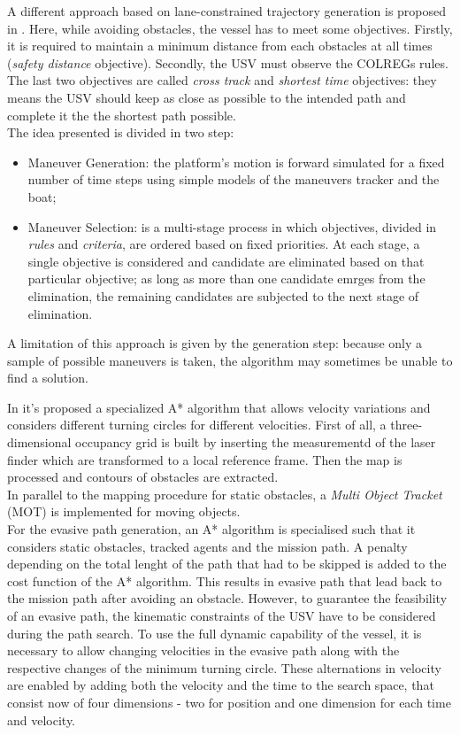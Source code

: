 \documentclass[journal]{IEEEtran}
\begin{document}
              A different approach based on lane-constrained trajectory generation is proposed in \parencite{Tan2010}. Here, while avoiding obstacles, the vessel has to meet some objectives. Firstly, it is required to maintain a minimum distance from each obstacles at all times (\textit{safety distance} objective). Secondly, the USV must observe the COLREGs rules. The last two objectives are called \textit{cross track} and \textit{shortest time} objectives: they means the USV should keep as close as possible to the intended path and complete it the the shortest path possible.\\
              The idea presented is divided in two step:
                    \begin{itemize}
                          \item Maneuver Generation: the platform's motion is forward simulated for a fixed number of time steps using simple models of the maneuvers tracker and the boat;
                          \item Maneuver Selection: is a multi-stage process in which objectives, divided in \textit{rules} and \textit{criteria}, are ordered based on fixed priorities. At each stage, a single objective is considered and candidate are eliminated based on that particular objective; as long as more than one candidate emrges from the elimination, the remaining candidates are subjected to the next stage of elimination.
                    \end{itemize}
              A limitation of this approach is given by the generation step: because only a sample of possible maneuvers is taken, the algorithm may sometimes be unable to find a solution.

              \indent In \parencite{Blaich2015} it's proposed a specialized A* algorithm that allows velocity variations and considers different turning circles for different velocities. First of all, a three-dimensional occupancy grid is built by inserting the measurementd of the laser finder which are transformed to a local reference frame. Then the map is processed and contours of obstacles are extracted.\\
              In parallel to the mapping procedure for static obstacles, a \textit{Multi Object Tracket} (MOT) is implemented for moving objects.\\
              For the evasive path generation, an A* algorithm is specialised such that it considers static obstacles, tracked agents and the mission path. A penalty depending on the total lenght of the path that had to be skipped is added to the cost function of the A* algorithm. This results in evasive path that lead back to the mission path after avoiding an obstacle. However, to guarantee the feasibility of an evasive path, the kinematic constraints of the USV have to be considered during the path search. To use the full dynamic capability of the vessel, it is necessary to allow changing velocities in the evasive path along with the respective changes of the minimum turning circle. These alternations in velocity are enabled by adding both the velocity and the time to the search space, that consist now of four dimensions - two for position and one dimension for each time and velocity.
\end{document}
